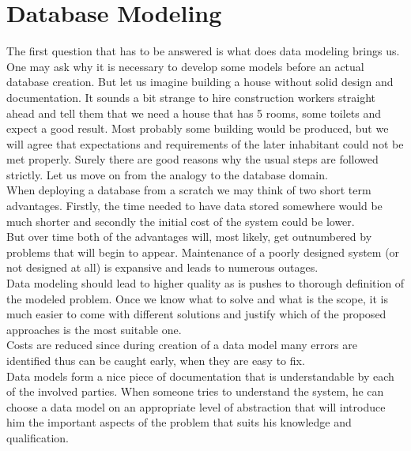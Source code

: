 \chapter{Database Modeling}
\label{chap:database_modeling}

The first question that has to be answered is what does data modeling brings us. \\

One may ask why it is necessary to develop some models before an actual database creation.
But let us imagine building a house without solid design and documentation. 
It sounds a bit strange to hire construction workers straight ahead and tell them that we need a house that has 5 rooms, some toilets and expect a good result. Most probably some building would be produced, but we will agree that expectations and requirements of the later inhabitant could not be met properly.
Surely there are good reasons why the usual steps are followed strictly.
Let us move on from the analogy to the database domain. \\
When deploying a database from a scratch we may think of two short term advantages. Firstly, the time needed to have data stored somewhere would be much shorter and secondly the initial cost of the system could be lower. \\
But over time both of the advantages will, most likely, get outnumbered by problems that will begin to appear. Maintenance of a poorly designed system (or not designed at all) is expansive and leads to numerous outages. \\

Data modeling should lead to higher quality as is pushes to thorough definition of the modeled problem. Once we know what to solve and what is the scope, it is much easier to come with different solutions and justify which of the proposed approaches is the most suitable one. \\

Costs are reduced since during creation of a data model many errors are identified thus can be caught early, when they are easy to fix. \\

Data models form a nice piece of documentation that is understandable by each of the involved parties. When someone tries to understand the system, he can choose a data model on an appropriate level of abstraction that will introduce him the important aspects of the problem that suits his knowledge and qualification. \\

